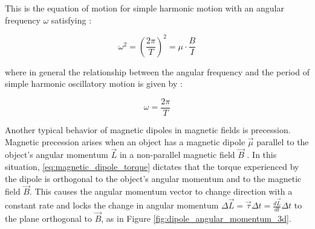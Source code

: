 \documentclass[11pt]{article}
\begin{document}
This is the equation of motion for simple harmonic motion with an
angular frequency $\omega$ satisfying \cite{diffeq}:

\begin{equation}
  \omega ^2 = \left ( \frac{2\pi}{T} \right )^2 =  \mu \cdot \frac{B}{I}
  \label{eq:sho_lr}
\end{equation}

where in general the relationship between the angular frequency and
the period of simple harmonic oscillatory motion is given by \cite{diffeq}:

\begin{equation}
  \omega = \frac{2\pi}{T}
  \label{eq:omega_period}
\end{equation}

\vspace{1em}

Another typical behavior of magnetic dipoles in magnetic fields is
precession. Magnetic precession arises when an object has a magnetic
dipole $\vec \mu$ parallel to the object's angular momentum $\vec L$
in a non-parallel magnetic field $\vec B$ \cite{young, harris}.
In this situation,
\eqref{eq:magnetic_dipole_torque} dictates that the torque experienced by
the dipole is orthogonal to the object's angular momentum and to the
magnetic field $\vec B$. This causes the angular momentum vector to change
direction with a constant rate and locks the change in angular
momentum $\Delta \vec L = \vec \tau \Delta t = \frac{d\vec L}{d t}
\Delta t$ to the
plane orthogonal
to $\vec B$, as in Figure \ref{fig:dipole_angular_momentum_3d}.
\end{document}
